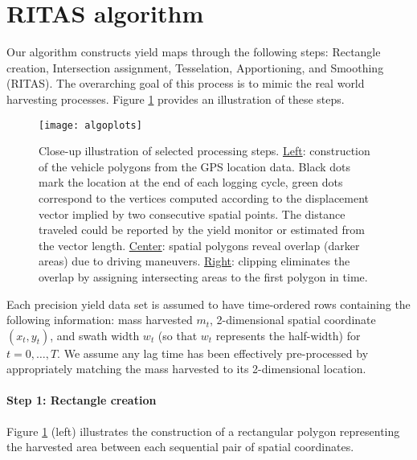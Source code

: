 \section{RITAS algorithm}
\label{sec:ritas}

Our algorithm constructs yield maps through the following steps:
Rectangle creation, Intersection assignment, Tesselation,
Apportioning, and Smoothing (RITAS). The overarching goal of this
process is to mimic the real world harvesting processes. Figure
\ref{fig:closeup} provides an illustration of these steps.

\begin{figure}[h!]  \centering
  \texttt{[image: algoplots]}
  \caption[Close-up illustration of selected algorithm steps]{Close-up
    illustration of selected processing steps. \underline{Left}:
    construction of the vehicle polygons from the GPS location
    data. Black dots mark the location at the end of each logging
    cycle, green dots correspond to the vertices computed according to
    the displacement vector implied by two consecutive spatial
    points. The distance traveled could be reported by the yield
    monitor or estimated from the vector length. \underline{Center}:
    spatial polygons reveal overlap (darker areas) due to driving
    maneuvers. \underline{Right}: clipping eliminates the overlap by
    assigning intersecting areas to the first polygon in time.}
    \label{fig:closeup}
\end{figure}

Each precision yield data set is assumed to have time-ordered rows
containing the following information: mass harvested $m_t$,
2-dimensional spatial coordinate $(x_t,y_t)$, and swath width $w_t$
(so that $w_t$ represents the half-width) for $t=0,\ldots,T$.  We
assume any lag time has been effectively pre-processed by
appropriately matching the mass harvested to its 2-dimensional
location.

\paragraph*{Step 1: Rectangle creation}

Figure \ref{fig:closeup} (left) illustrates the construction of a
rectangular polygon representing the harvested area between each
sequential pair of spatial coordinates.

